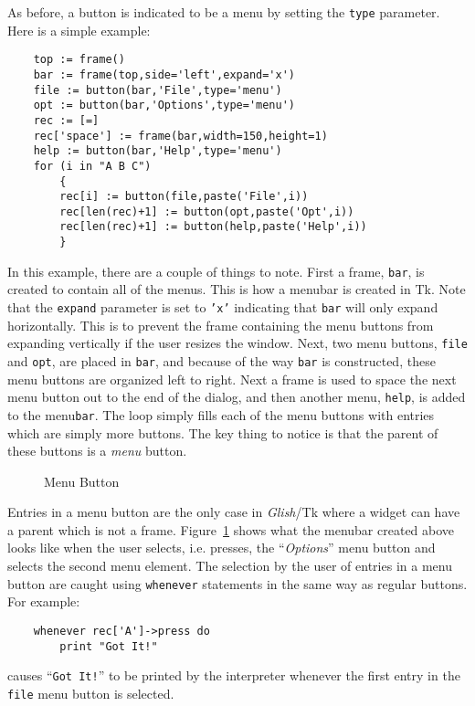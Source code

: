 As before, a button is indicated to be a menu by setting the {\tt type} parameter.
Here is a simple example:
\begin{verbatim}
    top := frame()
    bar := frame(top,side='left',expand='x')
    file := button(bar,'File',type='menu')
    opt := button(bar,'Options',type='menu')
    rec := [=]
    rec['space'] := frame(bar,width=150,height=1)
    help := button(bar,'Help',type='menu')
    for (i in "A B C")
        {
        rec[i] := button(file,paste('File',i))
        rec[len(rec)+1] := button(opt,paste('Opt',i))
        rec[len(rec)+1] := button(help,paste('Help',i))
        }
\end{verbatim}
In this example, there are a couple of things to note. First a frame, {\tt bar}, is
created to contain all of the menus. This is how a menubar is created in Tk. Note
that the {\tt expand} parameter is set to {\tt 'x'} indicating that {\tt bar}
will only expand horizontally. This is to prevent the frame containing the
menu buttons from expanding vertically if the user resizes the window. Next,
two menu buttons, {\tt file} and {\tt opt},  are placed in {\tt bar}, and because
of the way {\tt bar} is constructed, these menu buttons are organized left to
right. Next a frame is used to space the next menu button out to the end of the
dialog, and then another menu, {\tt help}, is added to the menu{\tt bar}. The
loop simply fills each of the menu buttons with entries which are simply more
buttons. The key thing to notice is that the parent of these buttons is a
{\em menu} button. 

\begin{figure}[thb]
\centerline{}
\caption{ Menu Button }
\label{tkmenu}
\end{figure}
Entries in a menu button are the only case in {\em Glish}/Tk where a widget can have
a parent which is not a frame. Figure~\ref{tkmenu} shows what the menubar created
above looks like when the user selects, i.e. presses,  the ``{\em Options}''
menu button and selects the second menu element. The selection by the user of
entries in a menu button are caught using {\tt whenever} statements in the same
way as regular buttons. For example:
\begin{verbatim}
    whenever rec['A']->press do
        print "Got It!"
\end{verbatim}
causes ``{\tt Got It!}'' to be printed by the interpreter whenever the first
entry in the {\tt file} menu button is selected.
\FloatBarrier

